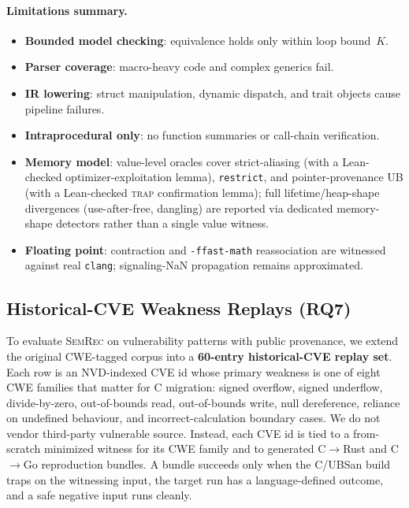 \documentclass[10pt,a4paper]{article}
\begin{document}
\paragraph{Limitations summary.}
\begin{itemize}[nosep]
  \item \textbf{Bounded model checking}: equivalence holds only
    within loop bound~$K$.
  \item \textbf{Parser coverage}: macro-heavy code
    and complex generics fail.
  \item \textbf{IR lowering}: struct manipulation, dynamic dispatch,
    and trait objects cause pipeline failures.
  \item \textbf{Intraprocedural only}: no function summaries or
    call-chain verification.
  \item \textbf{Memory model}: value-level oracles cover strict-aliasing
    (with a Lean-checked optimizer-exploitation lemma), \texttt{restrict}, and
    pointer-provenance UB (with a Lean-checked \textsc{trap} confirmation
    lemma); full lifetime/heap-shape divergences (use-after-free,
    dangling) are reported via dedicated memory-shape detectors rather than a
    single value witness.
  \item \textbf{Floating point}: contraction and \texttt{-ffast-math}
    reassociation are witnessed against real \texttt{clang}; signaling-NaN
    propagation remains approximated.
\end{itemize}

\subsection{Historical-CVE Weakness Replays (RQ7)}\label{sec:eval-cve}

To evaluate \textsc{SemRec} on vulnerability patterns with public
provenance, we extend the original CWE-tagged corpus into a
\textbf{60-entry historical-CVE replay set}.  Each row is an NVD-indexed
CVE id whose primary weakness is one of eight CWE families that matter
for C migration: signed overflow, signed underflow, divide-by-zero,
out-of-bounds read, out-of-bounds write, null dereference, reliance on
undefined behaviour, and incorrect-calculation boundary cases.  We do
not vendor third-party vulnerable source.  Instead, each CVE id is tied
to a from-scratch minimized witness for its CWE family and to generated
C$\to$Rust and C$\to$Go reproduction bundles.  A bundle succeeds only
when the C/UBSan build traps on the witnessing input, the target run has
a language-defined outcome, and a safe negative input runs cleanly.
\end{document}
